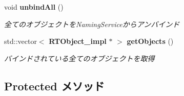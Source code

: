 \begin{DoxyCompactItemize}
void {\bf unbindAll} ()
\begin{DoxyCompactList}\small\item\em 全てのオブジェクトをNamingServiceからアンバインド \item\end{DoxyCompactList}\item 
std::vector$<$ {\bf RTObject\_\-impl} $\ast$ $>$ {\bf getObjects} ()
\begin{DoxyCompactList}\small\item\em バインドされている全てのオブジェクトを取得 \item\end{DoxyCompactList}\end{DoxyCompactItemize}
\subsection*{Protected メソッド}
